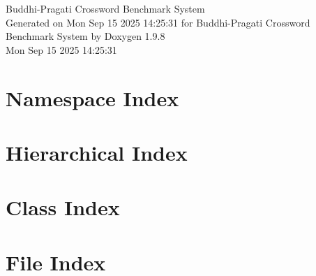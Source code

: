 \documentclass[twoside]{book}
\newcommand{\+}{\discretionary{\mbox{\scriptsize$\hookleftarrow$}}{}{}}
\newcommand{\clearemptydoublepage}{%
    \newpage{\pagestyle{empty}\cleardoublepage}%
  }
\begin{document}
  \raggedbottom
    \hypersetup{pageanchor=false,
                bookmarksnumbered=true,
                pdfencoding=unicode
               }
  \begin{titlepage}
  \vspace*{7cm}
  \begin{center}%
  {\Large Buddhi-\/\+Pragati Crossword Benchmark System}\\
  \vspace*{1cm}
  {\large Generated on Mon Sep 15 2025 14\+:25\+:31 for Buddhi-\/\+Pragati Crossword Benchmark System by Doxygen 1.9.8}\\
    \vspace*{0.5cm}
    {\small Mon Sep 15 2025 14:25:31}
  \end{center}
  \end{titlepage}
  \clearemptydoublepage
  \tableofcontents
  \clearemptydoublepage
  \hypersetup{pageanchor=true}


\chapter{Namespace Index}

\chapter{Hierarchical Index}

\chapter{Class Index}

\chapter{File Index}

\end{document}
